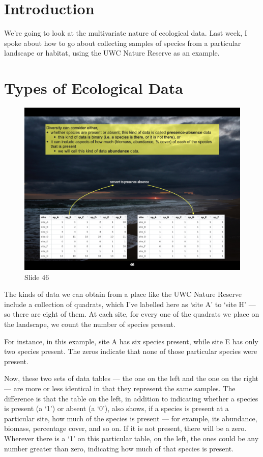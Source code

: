 \documentclass[
  10pt,
]{book}
\begin{document}
\section{Introduction}\label{introduction}

We're going to look at the multivariate nature of ecological data. Last
week, I spoke about how to go about collecting samples of species from a
particular landscape or habitat, using the UWC Nature Reserve as an
example.

\section{Types of Ecological Data}\label{types-of-ecological-data}

\begin{figure}[ht]
\centering
\includegraphics[width=0.8\linewidth]{../images/BDC334/BDC334-046.jpeg}
\caption*{Slide 46}
\end{figure}

The kinds of data we can obtain from a place like the UWC Nature Reserve
include a collection of quadrats, which I've labelled here as `site A'
to `site H' --- so there are eight of them. At each site, for every one
of the quadrats we place on the landscape, we count the number of
species present.

For instance, in this example, site A has six species present, while
site E has only two species present. The zeros indicate that none of
those particular species were present.

Now, these two sets of data tables --- the one on the left and the one
on the right --- are more or less identical in that they represent the
same samples. The difference is that the table on the left, in addition
to indicating whether a species is present (a `1') or absent (a `0'),
also shows, if a species is present at a particular site, how much of
the species is present --- for example, its abundance, biomass,
percentage cover, and so on. If it is not present, there will be a zero.
Wherever there is a `1' on this particular table, on the left, the ones
could be any number greater than zero, indicating how much of that
species is present.
\end{document}
